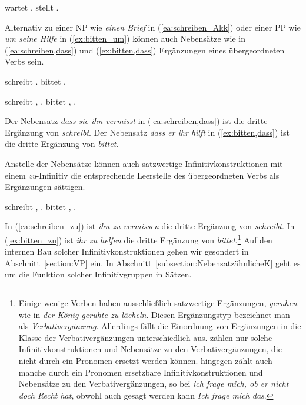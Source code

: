 \ea 
\ea \label{ea:wartetAuf}  wartet .
\ex \label{ex:stelltWohin}  stellt  .
\z 
\z 

\largerpage[2]
Alternativ zu einer NP wie \textit{einen Brief} in (\ref{ea:schreiben_Akk}) oder einer PP wie \textit{um seine Hilfe} in (\ref{ex:bitten_um}) können auch Nebensätze wie in (\ref{ea:schreiben,dass}) und (\ref{ex:bitten,dass}) Ergänzungen eines übergeordneten Verbs sein.

\ea 
\ea \label{ea:schreiben_Akk}  schreibt  .
\ex \label{ex:bitten_um}  bittet  .
\z 
\z 

\ea \label{ea:NeSaErgänzung}
\ea \label{ea:schreiben,dass}  schreibt , .
\ex \label{ex:bitten,dass}  bittet , .
\z 
\z\clearpage

Der Nebensatz \textit{dass sie ihn vermisst} in (\ref{ea:schreiben,dass}) ist die dritte Ergänzung von \textit{schreibt}. Der Nebensatz \textit{dass er ihr hilft} in (\ref{ex:bitten,dass}) ist die dritte Ergänzung von \textit{bittet}. 

Anstelle der Nebensätze können auch satzwertige Infinitivkonstruktionen mit einem \textit{zu}-Infinitiv die entsprechende Leerstelle des übergeordneten Verbs als Ergänzungen sättigen.

\ea \label{ea:zuInfErgänzung}
\ea \label{ea:schreiben_zu}  schreibt , .
\ex \label{ex:bitten_zu}  bittet , .
\z 
\z 

In (\ref{ea:schreiben_zu}) ist \textit{ihn zu vermissen} die dritte Ergänzung von \textit{schreibt}. In (\ref{ex:bitten_zu}) ist \textit{ihr zu helfen} die dritte Ergänzung von \textit{bittet}.\footnote{Einige wenige Verben haben ausschließlich satzwertige Ergänzungen, \zB \textit{geruhen} wie in \textit{der König geruhte zu lächeln}. Diesen Ergänzungstyp bezeichnet man als \textit{Verbativergänzung}. Allerdings fällt die Einordnung von Ergänzungen in die Klasse der Verbativergänzungen unterschiedlich aus. \citet[1118]{ZifHoffStr1997} zählen nur solche Infinitivkonstruktionen und Nebensätze zu den Verbativergänzungen, die nicht durch ein Pronomen ersetzt werden können. \citet[213--214]{Eroms2000} hingegen zählt auch manche durch ein Pronomen ersetzbare Infinitivkonstruktionen und Nebensätze zu den Verbativergänzungen, so \zB bei \textit{ich frage mich, ob er nicht doch Recht hat}, obwohl auch gesagt werden kann \textit{Ich frage mich das}.} Auf den internen Bau solcher Infinitivkonstruktionen gehen wir gesondert in Abschnitt~\ref{section:VP} ein. In Abschnitt~\ref{subsection:NebensatzähnlicheK} geht es um die Funktion solcher Infinitivgruppen in Sätzen.


